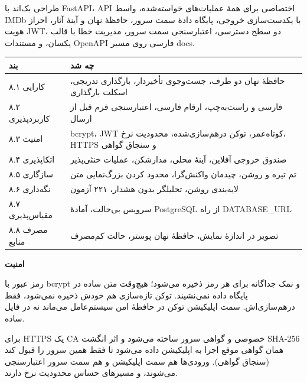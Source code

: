 \documentclass[12pt]{article}
\newcommand{\en}[1]{\textenglish{#1}}
\newcommand{\heading}[1]{%
  \par
  \vskip 0pt plus 7\baselineskip\penalty -100\vskip 0pt plus -7\baselineskip
  \vspace{1.2em}%
  {\Large\bfseries #1}%
  \par\vspace{0.6em}%
  \nobreak
}
\newcommand{\sub}[1]{%
  \par\vspace{0.8em}{\large\bfseries #1}\par\vspace{0.35em}\nobreak
}
\begin{document}
\sub{بخش ۷ — بک‌اند اختصاصی}

طراحی بک‌اند با \en{FastAPI}، \en{API} اختصاصی برای همهٔ عملیات‌های خواسته‌شده، واسط
\en{IMDb} با یکدست‌سازی خروجی، پایگاه دادهٔ سمت سرور، حافظهٔ نهان و آینهٔ آثار، احراز هویت
\en{JWT}، دو سطح دسترسی، اعتبارسنجی سمت سرور، مدیریت خطا با قالب یکسان، و مستندات
\en{OpenAPI} فارسی روی مسیر \en{docs}.

\sub{بخش ۸ — نیازمندی‌های غیرکاربردی}

\begin{center}
\begin{tabular}{|l|p{9.3cm}|}
\hline
\textbf{بند} & \textbf{چه شد} \\
\hline
\textenglish{۸.۱} کارایی & حافظهٔ نهان دو طرف، جست‌وجوی تأخیردار، بارگذاری تدریجی، اسکلت بارگذاری \\
\hline
\textenglish{۸.۲} کاربردپذیری & فارسی و راست‌به‌چپ، ارقام فارسی، اعتبارسنجی فرم قبل از ارسال \\
\hline
\textenglish{۸.۳} امنیت & \en{bcrypt}، \en{JWT} کوتاه‌عمر، توکن درهم‌سازی‌شده، محدودیت نرخ، \en{HTTPS} و سنجاق گواهی \\
\hline
\textenglish{۸.۴} اتکاپذیری & صندوق خروجی آفلاین، آینهٔ محلی، مدارشکن، عملیات خنثی‌پذیر \\
\hline
\textenglish{۸.۵} سازگاری & تم تیره و روشن، چیدمان واکنش‌گرا، محدود کردن بزرگ‌نمایی متن \\
\hline
\textenglish{۸.۶} نگه‌داری & لایه‌بندی روشن، تحلیلگر بدون هشدار، ۲۲۱ آزمون \\
\hline
\textenglish{۸.۷} مقیاس‌پذیری & سرویس بی‌حالت، آمادهٔ \en{PostgreSQL} از راه \en{DATABASE\_URL} \\
\hline
\textenglish{۸.۸} مصرف منابع & تصویر در اندازهٔ نمایش، حافظهٔ نهان پوستر، حالت کم‌مصرف \\
\hline
\end{tabular}
\end{center}

\heading{امنیت}

رمز عبور با \en{bcrypt} و نمک جداگانه برای هر رمز ذخیره می‌شود؛ هیچ‌وقت متن ساده در پایگاه
داده نمی‌نشیند. توکن تازه‌سازی هم خودش ذخیره نمی‌شود، فقط درهم‌سازی‌اش. سمت اپلیکیشن توکن در
حافظهٔ امن سیستم‌عامل می‌ماند نه در فایل ساده.

برای \en{HTTPS} یک \en{CA} خصوصی و گواهی سرور ساخته می‌شود و اثر انگشت \en{SHA-256} همان گواهی
موقع اجرا به اپلیکیشن داده می‌شود تا فقط همین سرور را قبول کند (سنجاق گواهی). ورودی‌ها هم سمت
اپلیکیشن و هم سمت سرور اعتبارسنجی می‌شوند، و مسیرهای حساس محدودیت نرخ دارند.
\end{document}
